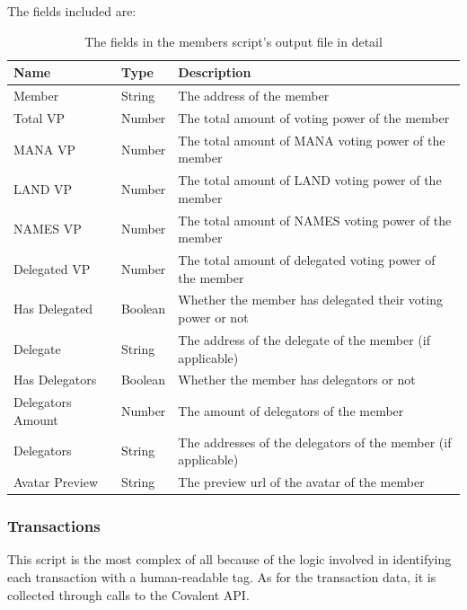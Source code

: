 \documentclass[MSE,Master,english]{twbook}%
\begin{document}
The fields included are:
\begin{table}[H]
  \centering
  \begin{tabularx}{\textwidth}{|l|l|X|}
  \hline
  \textbf{Name} & \textbf{Type} & \textbf{Description}                                            \\ \hline
  Member            & String  & The address of the member                                     \\ \hline
  Total VP          & Number  & The total amount of voting power of the member                \\ \hline
  MANA VP           & Number  & The total amount of MANA voting power of the member           \\ \hline
  LAND VP           & Number  & The total amount of LAND voting power of the member           \\ \hline
  NAMES VP          & Number  & The total amount of NAMES voting power of the member          \\ \hline
  Delegated VP      & Number  & The total amount of delegated voting power of the member      \\ \hline
  Has Delegated     & Boolean & Whether the member has delegated their voting power or not    \\ \hline
  Delegate          & String  & The address of the delegate of the member (if applicable)     \\ \hline
  Has Delegators    & Boolean & Whether the member has delegators or not                      \\ \hline
  Delegators Amount & Number  & The amount of delegators of the member                        \\ \hline
  Delegators        & String  & The addresses of the delegators of the member (if applicable) \\ \hline
  Avatar Preview    & String  & The preview url of the avatar of the member                   \\ \hline
  \end{tabularx}
  \caption{The fields in the members script's output file in detail}
  \label{table:members}
\end{table}

\subsubsection{Transactions}
This script is the most complex of all because of the logic involved in identifying each transaction with a human-readable tag. As for the transaction data, it is collected through calls to the Covalent API.
\end{document}
